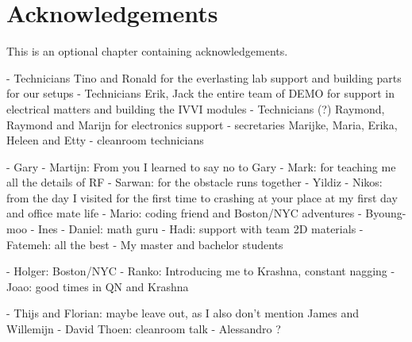 \chapter*{Acknowledgements}
\label{acknowledgements}

This is an optional chapter containing acknowledgements.

- Technicians Tino and Ronald for the everlasting lab support and building parts for our setups
- Technicians Erik, Jack the entire team of DEMO for support in electrical matters and building the IVVI modules
- Technicians (?) Raymond, Raymond and Marijn for electronics support
- secretaries Marijke, Maria, Erika, Heleen and Etty
- cleanroom technicians

- Gary
- Martijn: From you I learned to say no to Gary
- Mark: for teaching me all the details of RF
- Sarwan: for the obstacle runs together
- Yildiz
- Nikos: from the day I visited for the first time to crashing at your place at my first day and office mate life
- Mario: coding friend and Boston/NYC adventures
- Byoung-moo
- Ines
- Daniel: math guru
- Hadi: support with team 2D materials
- Fatemeh: all the best
- My master and bachelor students

- Holger: Boston/NYC
- Ranko: Introducing me to Krashna, constant nagging
- Joao: good times in QN and Krashna

- Thijs and Florian: maybe leave out, as I also don't mention James and Willemijn
- David Thoen: cleanroom talk
- Alessandro ?